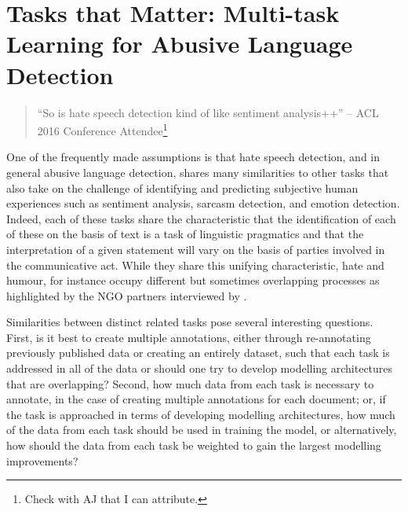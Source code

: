 \ifpdf
    \graphicspath{{Chapter5/Figs/Raster/}{Chapter5/Figs/PDF/}{Chapter5/Figs/}}
\else
    \graphicspath{{Chapter5/Figs/Vector/}{Chapter5/Figs/}}
\fi

\chapter[Tasks that Matter: Multi-task Learning for Abusive Language Detection]{Tasks that Matter: Multi-task Learning for Abusive Language Detection\footnotemark{}}\label{chap:mtl}

\begin{quote}
  ``So is hate speech detection kind of like sentiment analysis++'' -- ACL 2016 Conference Attendee\footnote{Check with AJ that I can attribute.}
\end{quote}

One of the frequently made assumptions is that hate speech detection, and in general abusive language detection, shares many similarities to other tasks that also take on the challenge of identifying and predicting subjective human experiences such as sentiment analysis, sarcasm detection, and emotion detection.
Indeed, each of these tasks share the characteristic that the identification of each of these on the basis of text is a task of linguistic pragmatics and that the interpretation of a given statement will vary on the basis of parties involved in the communicative act.
While they share this unifying characteristic, hate and humour, for instance occupy different but sometimes overlapping processes as highlighted by the NGO partners interviewed by \citet{Rottger:2021}.

Similarities between distinct related tasks pose several interesting questions.
First, is it best to create multiple annotations, either through re-annotating previously published data or creating an entirely dataset, such that each task is addressed in all of the data or should one try to develop modelling architectures that are overlapping?
Second, how much data from each task is necessary to annotate, in the case of creating multiple annotations for each document; or, if the task is approached in terms of developing modelling architectures, how much of the data from each task should be used in training the model, or alternatively, how should the data from each task be weighted to gain the largest modelling improvements?

